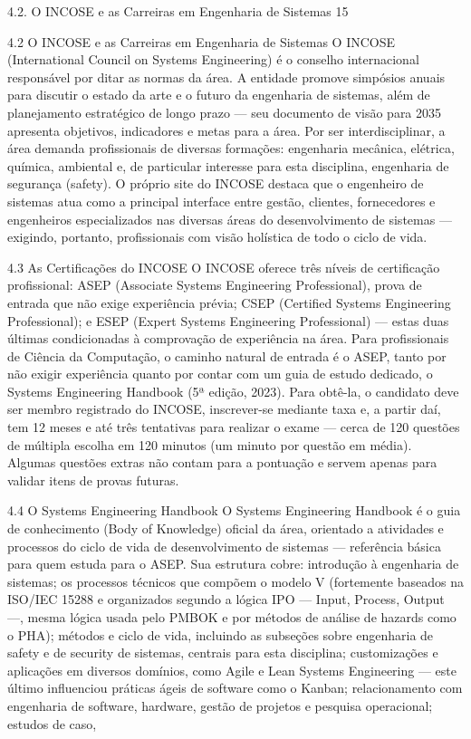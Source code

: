 4.2. O INCOSE e as Carreiras em Engenharia de Sistemas 15

4.2 O INCOSE e as Carreiras em Engenharia de Sistemas O INCOSE (International Council on Systems Engineering) é o conselho internacional responsável por ditar as normas da área. A entidade promove simpósios anuais para discutir o estado da arte e o futuro da engenharia de sistemas, além de planejamento estratégico de longo prazo — seu documento de visão para 2035 apresenta objetivos, indicadores e metas para a área. Por ser interdisciplinar, a área demanda profissionais de diversas formações: engenharia mecânica, elétrica, química, ambiental e, de particular interesse para esta disciplina, engenharia de segurança (safety). O próprio site do INCOSE destaca que o engenheiro de sistemas atua como a principal interface entre gestão, clientes, fornecedores e engenheiros especializados nas diversas áreas do desenvolvimento de sistemas — exigindo, portanto, profissionais com visão holística de todo o ciclo de vida.

4.3 As Certificações do INCOSE O INCOSE oferece três níveis de certificação profissional: ASEP (Associate Systems Engineering Professional), prova de entrada que não exige experiência prévia; CSEP (Certified Systems Engineering Professional); e ESEP (Expert Systems Engineering Professional) — estas duas últimas condicionadas à comprovação de experiência na área. Para profissionais de Ciência da Computação, o caminho natural de entrada é o ASEP, tanto por não exigir experiência quanto por contar com um guia de estudo dedicado, o Systems Engineering Handbook (5ª edição, 2023). Para obtê-la, o candidato deve ser membro registrado do INCOSE, inscrever-se mediante taxa e, a partir daí, tem 12 meses e até três tentativas para realizar o exame — cerca de 120 questões de múltipla escolha em 120 minutos (um minuto por questão em média). Algumas questões extras não contam para a pontuação e servem apenas para validar itens de provas futuras.

4.4 O Systems Engineering Handbook O Systems Engineering Handbook é o guia de conhecimento (Body of Knowledge) oficial da área, orientado a atividades e processos do ciclo de vida de desenvolvimento de sistemas — referência básica para quem estuda para o ASEP. Sua estrutura cobre: introdução à engenharia de sistemas; os processos técnicos que compõem o modelo V (fortemente baseados na ISO/IEC 15288 e organizados segundo a lógica IPO — Input, Process, Output —, mesma lógica usada pelo PMBOK e por métodos de análise de hazards como o PHA); métodos e ciclo de vida, incluindo as subseções sobre engenharia de safety e de security de sistemas, centrais para esta disciplina; customizações e aplicações em diversos domínios, como Agile e Lean Systems Engineering — este último influenciou práticas ágeis de software como o Kanban; relacionamento com engenharia de software, hardware, gestão de projetos e pesquisa operacional; estudos de caso,


